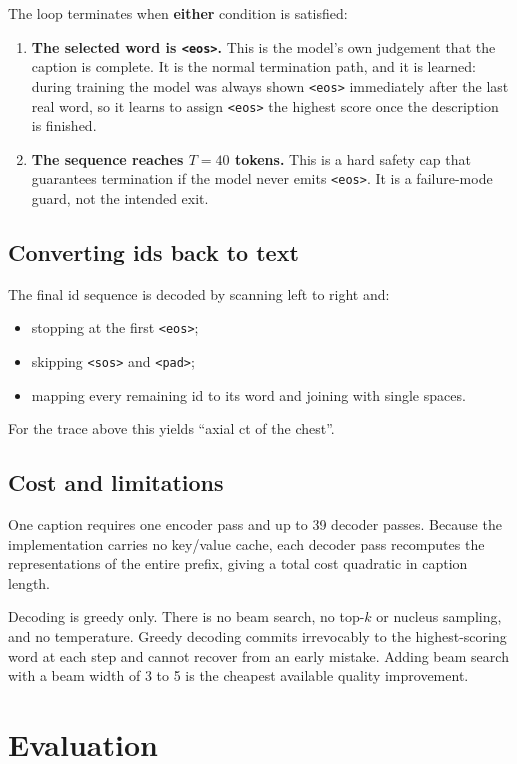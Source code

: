 \documentclass[12pt]{article}
\newcommand{\code}[1]{\texttt{#1}}
\begin{document}
The loop terminates when \textbf{either} condition is satisfied:
\begin{enumerate}[nosep]
\item \textbf{The selected word is \code{<eos>}.} This is the model's own judgement that the caption is complete. It is the normal termination path, and it is learned: during training the model was always shown \code{<eos>} immediately after the last real word, so it learns to assign \code{<eos>} the highest score once the description is finished.
\item \textbf{The sequence reaches $T=40$ tokens.} This is a hard safety cap that guarantees termination if the model never emits \code{<eos>}. It is a failure-mode guard, not the intended exit.
\end{enumerate}

\subsection{Converting ids back to text}

The final id sequence is decoded by scanning left to right and:
\begin{itemize}[nosep]
\item stopping at the first \code{<eos>};
\item skipping \code{<sos>} and \code{<pad>};
\item mapping every remaining id to its word and joining with single spaces.
\end{itemize}
For the trace above this yields ``axial ct of the chest''.

\subsection{Cost and limitations}

One caption requires one encoder pass and up to 39 decoder passes. Because the implementation carries no key/value cache, each decoder pass recomputes the representations of the entire prefix, giving a total cost quadratic in caption length.

Decoding is greedy only. There is no beam search, no top-$k$ or nucleus sampling, and no temperature. Greedy decoding commits irrevocably to the highest-scoring word at each step and cannot recover from an early mistake. Adding beam search with a beam width of 3 to 5 is the cheapest available quality improvement.

\section{Evaluation}
\end{document}
